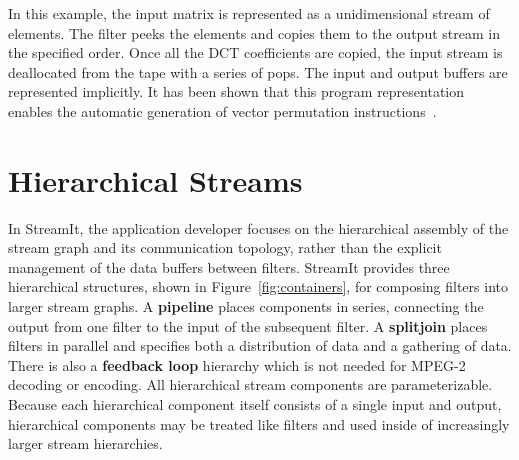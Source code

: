 In this example, the input matrix is represented as a unidimensional
stream of elements. The filter peeks the elements and
copies them to the output stream in the specified order. Once all the
DCT coefficients are copied, the input stream is deallocated from the
tape with a series of pops. The input and output buffers
are represented implicitly. It has been shown that this program representation
enables the automatic generation of vector permutation 
instructions~\cite{yelick04msp}.

\section{Hierarchical Streams}

In StreamIt, the application developer focuses on the hierarchical
assembly of the stream graph and its communication topology, rather
than the explicit management of the data buffers between filters.
StreamIt provides three hierarchical structures, 
shown in Figure~\ref{fig:containers},
for composing filters into larger stream graphs.  
A \textbf{pipeline} places components in series,
connecting the output from one filter to the input of the subsequent filter. A
\textbf{splitjoin} places filters in parallel and specifies both a distribution of data and
a gathering of data. There is also a \textbf{feedback loop}
hierarchy which is not needed 
for MPEG-2 decoding or encoding. 
All 
hierarchical stream components are parameterizable.
Because each hierarchical component 
itself consists of a single
input and output, hierarchical components may be
treated like filters and used inside of
increasingly larger stream hierarchies.

\begin{figure}[h]
\end{figure}

